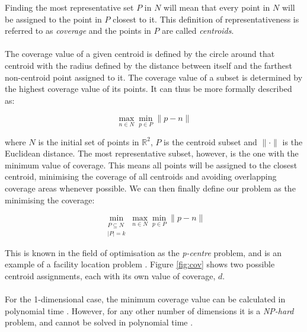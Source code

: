 Finding the most representative set $P$ in $N$ will mean that every point in $N$ will be assigned to the point in $P$ closest to it. This definition of representativeness is referred to as \emph{coverage} and the points in $P$ are called \emph{centroids}.
\paragraph{}
The coverage value of a given centroid is defined by the circle around that centroid with the radius defined by the distance between itself and the farthest non-centroid point assigned to it. The coverage value of a subset is determined by the highest coverage value of its points. It can thus be more formally described as:

\begin{equation}
\max_{n \in N}
	{\min_{p \in P}
		{\lVert p-n \rVert}
	}
\end{equation}

\noindent
where $N$ is the initial set of points in $\mathbb{R}^2$, $P$ is the centroid subset and $\lVert \cdot \rVert $ is the Euclidean distance.
The most representative subset, however, is the one with the minimum value of coverage. This means all points will be assigned to the closest centroid, minimising the coverage of all centroids and avoiding overlapping coverage areas whenever possible.
We can then finally define our problem as the minimising the coverage:

\begin{equation}
\min_{\substack{P \subseteq N\\ \lvert P \rvert = k}}{\max_{n \in N}{\min_{p \in P}{\lVert p-n \rVert}}}
\end{equation}

\noindent
This is known in the field of optimisation as the \emph{p-centre} problem, and is an example of a facility location problem \cite{pcenter}. Figure \ref{fig:cov} shows two possible centroid assignments, each with its own value of coverage, $d$.



\paragraph{}
For the 1-dimensional case, the minimum coverage value can be calculated in polynomial time \cite{dvaz}. However, for any other number of dimensions it is a \emph{NP-hard} problem, and cannot be solved in polynomial time \cite{complex}.

